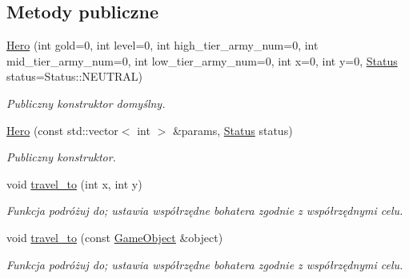 \subsection*{Metody publiczne}
\begin{DoxyCompactItemize}
\item 
\hyperlink{classmodel_1_1Hero_aeff27a625ef4629d57d2dba7497eb559}{Hero} (int gold=0, int level=0, int high\+\_\+tier\+\_\+army\+\_\+num=0, int mid\+\_\+tier\+\_\+army\+\_\+num=0, int low\+\_\+tier\+\_\+army\+\_\+num=0, int x=0, int y=0, \hyperlink{status_8hpp_a822822ece62ee330ee656034849df887}{Status} status=Status\+::\+N\+E\+U\+T\+R\+AL)
\begin{DoxyCompactList}\small\item\em Publiczny konstruktor domyślny. \end{DoxyCompactList}\item 
\hyperlink{classmodel_1_1Hero_a7c6ec503c2c1409ff11daa69c2d46f9a}{Hero} (const std\+::vector$<$ int $>$ \&params, \hyperlink{status_8hpp_a822822ece62ee330ee656034849df887}{Status} status)
\begin{DoxyCompactList}\small\item\em Publiczny konstruktor. \end{DoxyCompactList}\item 
\mbox{\label{classmodel_1_1Hero_abf940dc4b402b8798571272923741f17}} 
void \hyperlink{classmodel_1_1Hero_abf940dc4b402b8798571272923741f17}{travel\+\_\+to} (int x, int y)
\begin{DoxyCompactList}\small\item\em Funkcja podróżuj do; ustawia współrzędne bohatera zgodnie z współrzędnymi celu. \end{DoxyCompactList}\item 
\mbox{\label{classmodel_1_1Hero_aa1331373ce8cdc72574cf0c1376cdd7b}} 
void \hyperlink{classmodel_1_1Hero_aa1331373ce8cdc72574cf0c1376cdd7b}{travel\+\_\+to} (const \hyperlink{classmodel_1_1GameObject}{Game\+Object} \&object)
\begin{DoxyCompactList}\small\item\em Funkcja podróżuj do; ustawia współrzędne bohatera zgodnie z współrzędnymi celu. \end{DoxyCompactList}\item 
\mbox{\label{classmodel_1_1Hero_a02d55a332f0355fa1a87c65ea87691ff}} 

\end{DoxyCompactItemize}
